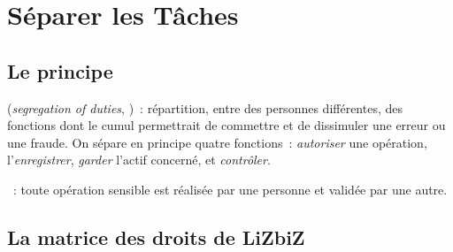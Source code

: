 \section{Séparer les Tâches}
\label{sec:c03-sod}

\subsection{Le principe}

\begin{boxdef}
(\textit{segregation of duties}, )~: répartition, entre des
personnes différentes, des fonctions dont le cumul permettrait de commettre
et de dissimuler une erreur ou une fraude. On sépare en principe quatre
fonctions~: \emph{autoriser} une opération, l'\emph{enregistrer},
\emph{garder} l'actif concerné, et \emph{contrôler}.

\medskip
{}~: toute
opération sensible est réalisée par une personne et validée par une autre.
\end{boxdef}

\subsection{La matrice des droits de LiZbiZ}

